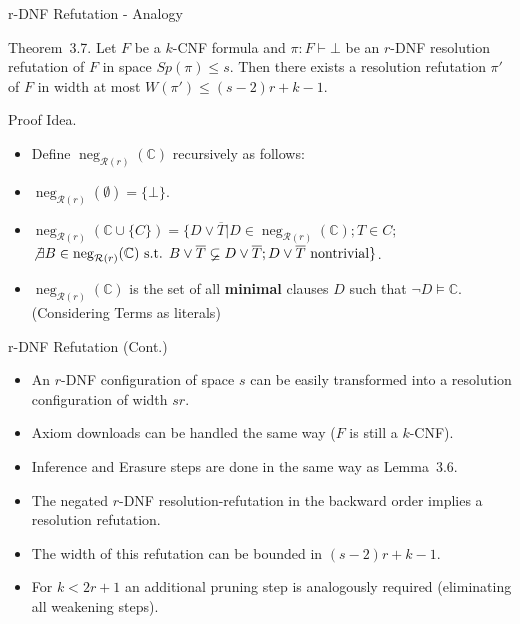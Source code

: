 \documentclass[t,usenames,dvipsnames]{beamer}
\newcommand {\nconf}{\operatorname{neg}}
\begin{document}
\begin{frame}{r-DNF Refutation - Analogy}
	\begin{block}{Theorem~3.7.}
		Let $F$ be a $k$-CNF formula and $\pi : F \vdash \bot$ be an $r$-DNF resolution
		refutation of $F$ in space $Sp(\pi) \leq s$. Then there exists a resolution
		refutation $\pi'$ of $F$ in width at most $W(\pi') \leq (s-2)r + k -1$.
	\end{block}
	\pause
	Proof Idea.
	\begin{itemize}[<+->]
		\item Define $\nconf_{\mathcal{R}(r)}(\mathbb{C})$ recursively as follows:
		\item[] $\nconf_{\mathcal{R}(r)}(\emptyset) = \{\bot\}$.
		\item[] $\nconf_{\mathcal{R}(r)}(\mathbb{C}\cup \{C\}) = \{D \lor \overline T| D \in
				\nconf_{\mathcal{R}(r)}(\mathbb{C}); T \in C;$\\
				\hspace{1cm} $\not\exists B \in \nconf_{\mathcal{R}(r)}(\mathbb{C})
				\text{ s.t. } B \lor \overline T \varsubsetneq D \lor \overline T ;
				D\lor \overline T \text{ nontrivial}\}$.
		\item $\nconf_{\mathcal{R}(r)}(\mathbb{C})$ is the set of all
			\textbf{minimal} clauses $D$ such that $\lnot D \models \mathbb{C}$.
			(Considering Terms as literals)
	\end{itemize}
\end{frame}
\begin{frame}{r-DNF Refutation (Cont.)}
	\begin{itemize}[<+->]
		\item An $r$-DNF configuration of space $s$ can be easily transformed into a
			resolution configuration of width $sr$.
		\item Axiom downloads can be handled the same way ($F$ is still a $k$-CNF).
		\item Inference and Erasure steps are done in the same way as Lemma~3.6.
		\item The negated $r$-DNF resolution-refutation in the backward order implies a
			resolution refutation.
		\item The width of this refutation can be bounded in $(s-2)r + k - 1$.
		\item For $k < 2r + 1$ an additional pruning step is analogously required
			(eliminating all weakening steps).
	\end{itemize}
\end{frame}
\end{document}
